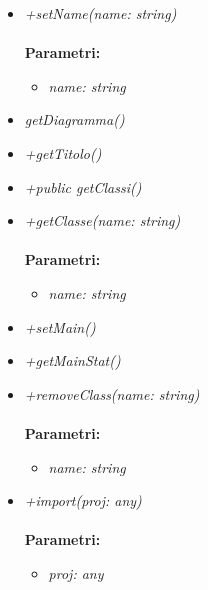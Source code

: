 \begin{itemize}
\begin{itemize}
\begin{itemize}
    		\end{itemize}
    		\item \emph{+setName(name: string)}\\
    		\\
    		\textbf{Parametri:}
    		\begin{itemize}
    			\item \emph{name: string}\\
    			
    		\end{itemize}
    		\item \emph{getDiagramma()}\\
    		
    		\item \emph{+getTitolo()}\\
    		
    		\item \emph{+public getClassi()}\\
    		
    		\item \emph{+getClasse(name: string)}\\
    		\\
    		\textbf{Parametri:}
    		\begin{itemize}
    			\item \emph{name: string}\\
    			
    		\end{itemize}
    		\item \emph{+setMain()}\\
    		
    		\item \emph{+getMainStat()}\\
    		
    		\item \emph{+removeClass(name: string)}\\
    		\\
    		\textbf{Parametri:}
    		\begin{itemize}
    			\item \emph{name: string}\\
    			
    		\end{itemize}
    		\item \emph{+import(proj: any)}\\
    		\\
    		\textbf{Parametri:}
    		\begin{itemize}
    			\item \emph{proj: any}\\
    			

\end{itemize}
\end{itemize}
\end{itemize}

